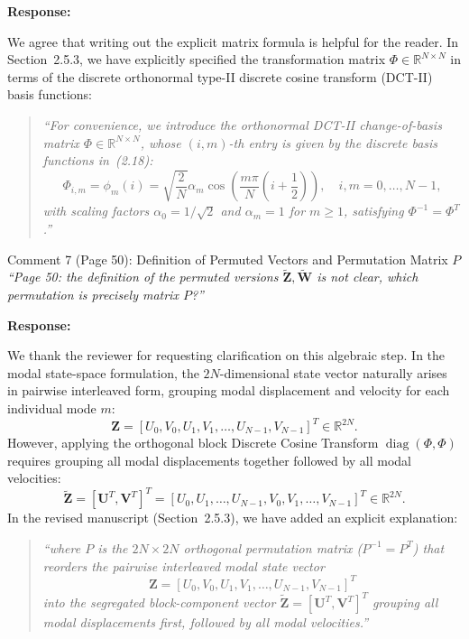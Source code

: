 \documentclass[11pt,a4paper]{article}
\newenvironment{response}{
    \par\vspace{1mm}\noindent\textbf{\textcolor{responseframe}{Response:}}\par\vspace{1mm}
}{
    \par\vspace{3mm}
}
\begin{document}
\begin{response}
We agree that writing out the explicit matrix formula is helpful for the reader. In Section~2.5.3, we have explicitly specified the transformation matrix $\Phi \in \mathbb{R}^{N \times N}$ in terms of the discrete orthonormal type-II discrete cosine transform (DCT-II) basis functions:
\begin{quote}
\emph{``For convenience, we introduce the orthonormal DCT-II change-of-basis matrix $\Phi \in \mathbb{R}^{N \times N}$, whose $(i,m)$-th entry is given by the discrete basis functions in~(2.18):
\begin{equation*}
\Phi_{i,m} = \phi_m(i) = \sqrt{\frac{2}{N}} \alpha_m \cos\!\left(\frac{m\pi}{N}\left(i + \frac{1}{2}\right)\right), \quad i, m = 0, \dots, N-1,
\end{equation*}
with scaling factors $\alpha_0 = 1/\sqrt{2}$ and $\alpha_m = 1$ for $m \ge 1$, satisfying $\Phi^{-1} = \Phi^T$.''}
\end{quote}
\end{response}

\vspace{2mm}
\begin{revcomment}{Comment 7 (Page 50): Definition of Permuted Vectors and Permutation Matrix $P$}
\emph{``Page 50: the definition of the permuted versions $\widetilde{\mathbf{Z}}, \widetilde{\mathbf{W}}$ is not clear, which permutation is precisely matrix $P$?''}
\end{revcomment}

\begin{response}
We thank the reviewer for requesting clarification on this algebraic step. In the modal state-space formulation, the $2N$-dimensional state vector naturally arises in pairwise interleaved form, grouping modal displacement and velocity for each individual mode $m$:
\[
\mathbf{Z} = [U_0, V_0, U_1, V_1, \dots, U_{N-1}, V_{N-1}]^T \in \mathbb{R}^{2N}.
\]
However, applying the orthogonal block Discrete Cosine Transform $\operatorname{diag}(\Phi, \Phi)$ requires grouping all modal displacements together followed by all modal velocities:
\[
\widetilde{\mathbf{Z}} = [\mathbf{U}^T, \mathbf{V}^T]^T = [U_0, U_1, \dots, U_{N-1}, V_0, V_1, \dots, V_{N-1}]^T \in \mathbb{R}^{2N}.
\]
In the revised manuscript (Section~2.5.3), we have added an explicit explanation:
\begin{quote}\emph{``where $P$ is the $2N\times2N$ orthogonal permutation matrix ($P^{-1} = P^T$) that reorders the pairwise interleaved modal state vector
\begin{equation*}
\mathbf Z = [U_0, V_0, U_1, V_1, \dots, U_{N-1}, V_{N-1}]^T
\end{equation*}
into the segregated block-component vector $\widetilde{\mathbf Z} = [\mathbf U^T, \mathbf V^T]^T$ grouping all modal displacements first, followed by all modal velocities.''}
\end{quote}
\end{response}
\end{document}
